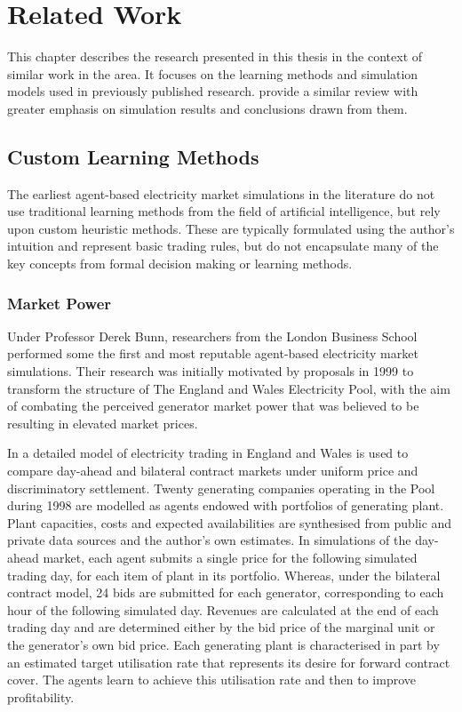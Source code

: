 \chapter{Related Work}
\label{ch:related_work}
This chapter describes the research presented in this thesis in the context of
similar work in the area.  It focuses on the learning methods and simulation
models used in previously published research.   provide a
similar review with greater emphasis on simulation results and conclusions
drawn from them.

\section{Custom Learning Methods}
The earliest agent-based electricity market simulations in the literature do not
use traditional learning methods from the field of artificial intelligence, but
rely upon custom heuristic methods.  These are typically formulated using the
author's intuition and represent basic trading rules, but do not encapsulate
many of the key concepts from formal decision making or learning methods.

\subsection{Market Power}
Under Professor Derek Bunn, researchers from the London Business School
performed some the first and most reputable agent-based electricity market
simulations.  Their research was initially motivated by proposals in 1999 to
transform the structure of The England and Wales Electricity Pool, with the aim
of combating the perceived generator market power that was believed to be
resulting in elevated market prices.

In  a detailed model of electricity trading in England and
Wales is used to compare day-ahead and bilateral contract markets under uniform
price and discriminatory settlement.  Twenty generating companies operating in
the Pool during 1998 are modelled as agents endowed with portfolios of
generating plant.  Plant capacities, costs and expected availabilities are
synthesised from public and private data sources and the author's own estimates.
 In simulations of the day-ahead market, each agent submits a single price for
the following simulated trading day, for each item of plant in its portfolio.
Whereas, under the bilateral contract model, 24 bids are submitted for each
generator, corresponding to each hour of the following simulated day.  Revenues
are calculated at the end of each trading day and are determined either by the
bid price of the marginal unit or the generator's own bid price.  Each
generating plant is characterised in part by an estimated target utilisation
rate that represents its desire for forward contract cover.  The agents learn to
achieve this utilisation rate and then to improve profitability.

